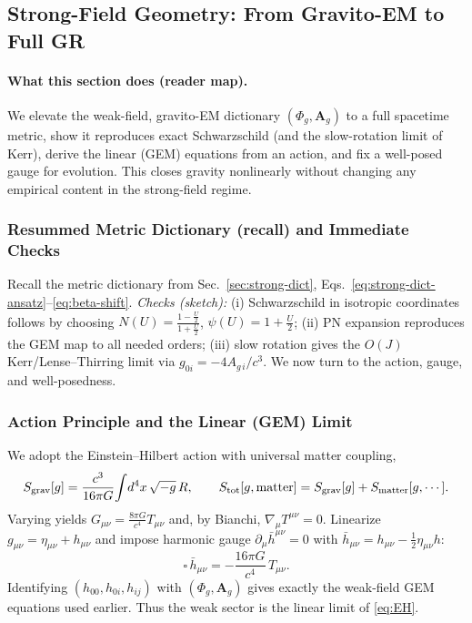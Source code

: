 
\subsection{Strong-Field Geometry: From Gravito-EM to Full GR}
\label{sec:strong-field-geometry}

\paragraph{What this section does (reader map).}
We elevate the weak-field, gravito-EM dictionary $(\Phi_g,\mathbf A_g)$ to a full spacetime metric, show it reproduces exact Schwarzschild (and the slow-rotation limit of Kerr), derive the linear (GEM) equations from an action, and fix a well-posed gauge for evolution. This closes gravity nonlinearly without changing any empirical content in the strong-field regime.

\subsubsection{Resummed Metric Dictionary (recall) and Immediate Checks}
\label{sec:resummed-dict}
Recall the metric dictionary from Sec.~\ref{sec:strong-dict},
Eqs.~\eqref{eq:strong-dict-ansatz}--\eqref{eq:beta-shift}.
\emph{Checks (sketch):} (i) Schwarzschild in isotropic coordinates follows by choosing
$N(U)=\frac{1-\tfrac{U}{2}}{1+\tfrac{U}{2}}$, $\psi(U)=1+\frac{U}{2}$; (ii) PN expansion reproduces the GEM map to all needed orders; (iii) slow rotation gives the $O(J)$ Kerr/Lense--Thirring limit via $g_{0i}=-4A_{g\,i}/c^3$.
We now turn to the action, gauge, and well-posedness.

\subsubsection{Action Principle and the Linear (GEM) Limit}
\label{sec:EH-closure}
\label{sec:action-linear}
We adopt the Einstein–Hilbert action with universal matter coupling,
\begin{equation}
S_{\rm grav}[g]=\frac{c^3}{16\pi G}\!\int \! d^4x\,\sqrt{-g}\,R,\qquad
S_{\rm tot}[g,\text{matter}]=S_{\rm grav}[g]+S_{\rm matter}[g,\cdots].
\label{eq:EH}
\end{equation}
Varying yields $G_{\mu\nu}=\tfrac{8\pi G}{c^4}T_{\mu\nu}$ and, by Bianchi, $\nabla_\mu T^{\mu\nu}=0$.
Linearize $g_{\mu\nu}=\eta_{\mu\nu}+h_{\mu\nu}$ and impose harmonic gauge $\partial_\mu \bar h^{\mu\nu}=0$ with $\bar h_{\mu\nu}\!=\!h_{\mu\nu}-\tfrac12\eta_{\mu\nu}h$:
\begin{equation}
\square\,\bar h_{\mu\nu}=-\frac{16\pi G}{c^4}\,T_{\mu\nu}.
\label{eq:lin_ein}
\end{equation}
Identifying $(h_{00},h_{0i},h_{ij})$ with $(\Phi_g,\mathbf A_g)$ gives exactly the weak-field GEM equations used earlier. Thus the weak sector is the linear limit of \eqref{eq:EH}.

